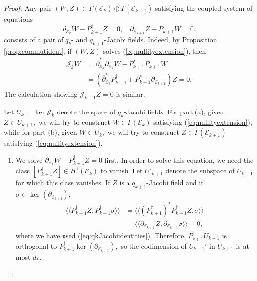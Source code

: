 \documentclass[10pt,a4paper]{amsart}
\newcommand{\delbar}{\overline{\partial}}
\newcommand{\del}{\partial}
\newcommand{\llangle}{\langle\!\langle}
\newcommand{\rrangle}{\rangle\!\rangle}
\begin{document}
\begin{proof}
    Any pair $(W,Z) \in \Gamma(\mathcal{E}_k) \oplus \Gamma(\mathcal{E}_{k+1})$ satisfying the coupled system of equations
        \begin{equation}\label{eq:nullityextension}
            \delbar_{\mathcal{E}_{k}} W - P^\dagger_{k+1} Z = 0, \quad \del_{\mathcal{E}_{k+1}} Z + P_{k+1} W = 0.
        \end{equation}
    consists of a pair of $q_k$- and $q_{k+1}$-Jacobi fields. Indeed, by Proposition \ref{prop:commutident}, if $(W,Z)$ solves (\ref{eq:nullityextension}), then
        \begin{equation*}
            \begin{aligned}
                \mathcal{J}_k W &= \delbar_{\mathcal{E}_k}^* \delbar_{\mathcal{E}_{k}} W - P_{k+1}^* P_{k+1} W \\
                &= \left( \delbar_{\mathcal{E}_k}^* P^\dagger_{k+1} + P_{k+1}^* \del_{\mathcal{E}_{k+1}} \right)Z = 0.
            \end{aligned}
        \end{equation*}
        The calculation showing $\mathcal{J}_{k+1} Z = 0$ is similar.
    
        Let $U_{k} = \ker \mathcal{J}_k$ denote the space of $q_{k}$-Jacobi fields. For part (a), given $Z \in U_{k+1},$ we will try to construct $W \in \Gamma(\mathcal{E}_k)$ satisfying (\ref{eq:nullityextension}), while for part (b), given $W \in U_k,$ we will try to construct $Z \in \Gamma(\mathcal{E}_{k+1})$ satisfying (\ref{eq:nullityextension}).

        \begin{enumerate}[label=(\alph*)]
        \item We solve $\delbar_{\mathcal{E}_{k}} W - P^\dagger_{k+1} Z = 0$ first. In order to solve this equation, we need the class $[P_{k+1}^\dagger Z] \in H^1(\mathcal{E}_k)$ to vanish. Let $U'_{k+1}$ denote the subspace of $U_{k+1}$ for which this class vanishes. If $Z$ is a $q_{k+1}$-Jacobi field and if $\sigma \in \ker(\del_{\mathcal{E}_{k+1}}),$
        \begin{equation*}
            \begin{aligned}
                \llangle P_{k+1}^\dagger Z, P_{k+1}^\dagger \sigma \rrangle &= \llangle (P_{k+1}^\dagger)^* P_{k+1}^\dagger Z, \sigma \rrangle \\
                &= \llangle \del_{\mathcal{E}_{k+1}} Z, \del_{\mathcal{E}_{k+1}} \sigma \rrangle = 0,
            \end{aligned}
        \end{equation*}
        where we have used (\ref{eq:qkJacobiidentities}). Therefore, $P_{k+1}^\dagger U_{k+1}$ is orthogonal to $P_{k+1}^\dagger \ker(\del_{\mathcal{E}_{k+1}}),$ so the codimension of $U_{k+1}'$ in $U_{k+1}$ is at most $d_k.$


\end{enumerate}
\end{proof}
\end{document}
